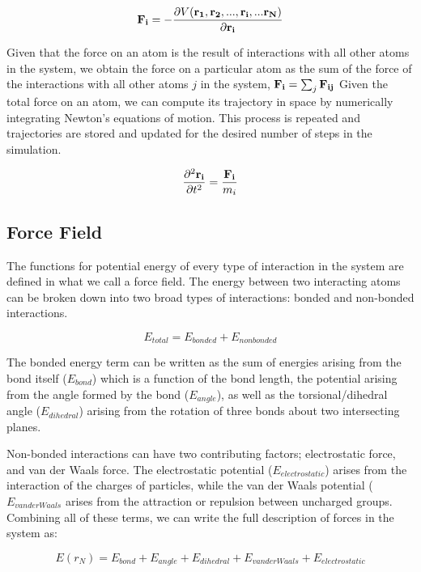 \begin{equation}
\mathbf{F_i}  = -\frac{\partial V(\mathbf{r_1}, \mathbf{r_2}, ..., \mathbf{r_i}, ... \mathbf{r_N)}}{\partial \mathbf{r_i}} 
 \end{equation}

 Given that the force on an atom is the result of interactions with all other atoms in the system, we obtain the force on a particular atom as the sum of the force of the interactions with all other atoms $j$ in the system,  $\mathbf{F_i} = \sum_{j} \mathbf{F_{ij}}$ Given the total force on an atom, we can compute its trajectory in space by numerically integrating Newton's equations of motion. This process is repeated and trajectories are stored and updated for the desired number of steps in the simulation.
 
 \begin{equation}
 \frac{\partial^2 \mathbf{r_{i}}}{\partial t^2} = \frac{\mathbf{F_i}}{m_i}
\end{equation}

\subsection{Force Field}

The functions for potential energy of every type of interaction in the system are defined in what we call a force field. The energy between two interacting atoms can be broken down into two broad types of interactions: bonded and non-bonded interactions.

\begin{equation}
E_{total} = E_{bonded} + E_{non bonded}
\end{equation}

The bonded energy term can be written as the sum of energies arising from the bond itself  ($E_{bond}$) which is a function of the bond length, the potential arising from the angle formed by the bond ($E_{angle}$), as well as the torsional/dihedral angle ($E_{dihedral}$) arising from the rotation of three bonds about two intersecting planes.

Non-bonded interactions can have two contributing factors; electrostatic force, and van der Waals force. The electrostatic potential ($E_{electrostatic}$) arises from the interaction of the charges of particles, while the van der Waals potential  ($E_{van der Waals}$ arises from the attraction or repulsion between uncharged groups. Combining all of these terms, we can write the full description of forces in the system as:

\begin{equation}
E(r_{N}) = E_{bond} + E_{angle} + E_{dihedral} + E_{van der Waals} + E_{electrostatic} 
\end{equation}


